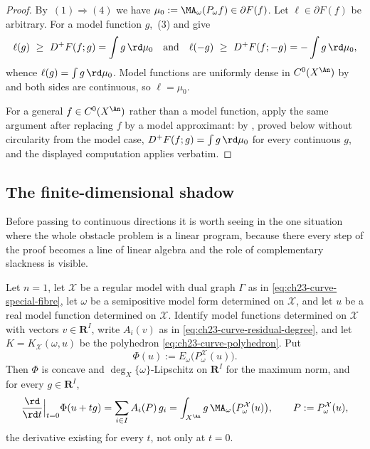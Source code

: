 \begin{proof}
By \,\((1)\Rightarrow(4)\) we
have \(\mu_0:=\MA_\omega(P_\omega f)\in\partial F(f)\).  Let
\(\ell\in\partial F(f)\) be arbitrary.  For a model function \(g\),
\,(3) and
 give
\[
 \ell(g)\ \geq\ D^+F(f;g)=\int g\,\rd\mu_0
 \quad\text{and}\quad
 \ell(-g)\ \geq\ D^+F(f;-g)=-\int g\,\rd\mu_0,
\]
whence \(\ell(g)=\int g\,\rd\mu_0\).  Model functions are uniformly dense in
\(C^0(X^{\An})\) by  and both sides are
continuous, so \(\ell=\mu_0\).

For a general \(f\in C^0(X^{\An})\) rather than a model function, apply the
same argument after replacing \(f\) by a model approximant: by
, proved below without
circularity from the model case, \(D^+F(f;g)=\int g\,\rd\mu_0\) for every
continuous \(g\), and the displayed computation applies verbatim.
\end{proof}

\subsection{The finite-dimensional shadow}
\label{sec:ch27-finite-shadow}

Before passing to continuous directions it is worth seeing
 in the one situation where
the whole obstacle problem is a linear program, because there every step of
the proof becomes a line of linear algebra and the role of complementary
slackness is visible.

\begin{proposition}
\label{prop:ch27-curve-shadow}
Let \(n=1\), let \(\mathcal X\) be a regular model with dual graph
\(\Gamma\) as in \eqref{eq:ch23-curve-special-fibre}, let \(\omega\) be a
semipositive model form determined on \(\mathcal X\), and let \(u\) be a
real model function determined on \(\mathcal X\).  Identify model functions
determined on \(\mathcal X\) with vectors \(v\in\mathbf R^I\), write
\(A_i(v)\) as in \eqref{eq:ch23-curve-residual-degree}, and let
\(K=K_{\mathcal X}(\omega,u)\) be the polyhedron
\eqref{eq:ch23-curve-polyhedron}.  Put
\[
 \Phi(u):=E_\omega\bigl(P^{\mathcal X}_\omega(u)\bigr).
\]
Then \(\Phi\) is concave and \(\deg_X\{\omega\}\)-Lipschitz on
\(\mathbf R^I\) for the maximum norm, and for every \(g\in\mathbf R^I\),
\begin{equation}\label{eq:ch27-curve-shadow-derivative}
 \frac{\rd}{\rd t}\Big|_{t=0}\Phi(u+tg)
 =\sum_{i\in I}A_i(P)\,g_i
 =\int_{X^{\An}}g\,\MA_\omega\bigl(P^{\mathcal X}_\omega(u)\bigr),
 \qquad P:=P^{\mathcal X}_\omega(u),
\end{equation}
the derivative existing for every \(t\), not only at \(t=0\).
\end{proposition}

